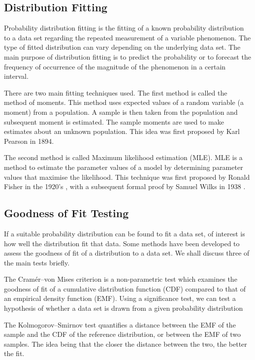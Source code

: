 \subsection{Distribution Fitting}

Probability distribution fitting is the fitting of a known probability distribution to a data set regarding the repeated measurement of a variable phenomenon. The type of fitted distribution can vary depending on the underlying data set. The main purpose of distribution fitting is to predict the probability or to forecast the frequency of occurrence of the magnitude of the phenomenon in a certain interval.

There are two main fitting techniques used. The first method is called the method of moments. This method uses expected values of a random variable (a moment) from a population. A sample is then taken from the population and subsequent moment is estimated. The sample moments are used to make estimates about an unknown population. This idea was first proposed by 
Karl Pearson in 1894\cite{pearson1894contributions}.

The second method is called Maximum likelihood estimation (MLE). MLE is a method to estimate the parameter values of a model by determining parameter values that maximise the likelihood.  This technique was first proposed by Ronald Fisher in the 1920's \cite{fisher1925theory}, with a subsequent formal proof by Samuel Wilks in 1938 \cite{wilks1938large}.

\subsection{Goodness of Fit Testing}

If a suitable probability distribution can be found to fit a data set, of interest is how well the distribution fit that data. Some methods have been developed to assess the goodness of fit of a distribution to a data set. We shall discuss three of the main tests briefly.

The Cram\'er--von Mises criterion \cite{cramer1928composition}\cite{von1928statistik} is a non-parametric test which examines the goodness of fit of a cumulative distribution function (CDF) compared to that of an empirical density function (EMF). Using a significance test, we can test a hypothesis of whether a data set is drawn from a given probability distribution

The Kolmogorov--Smirnov \cite{smirnov1948table} test quantifies a distance between the EMF of the sample and the CDF of the reference distribution, or between the EMF of two samples. The idea being that the closer the distance between the two, the better the fit. 

